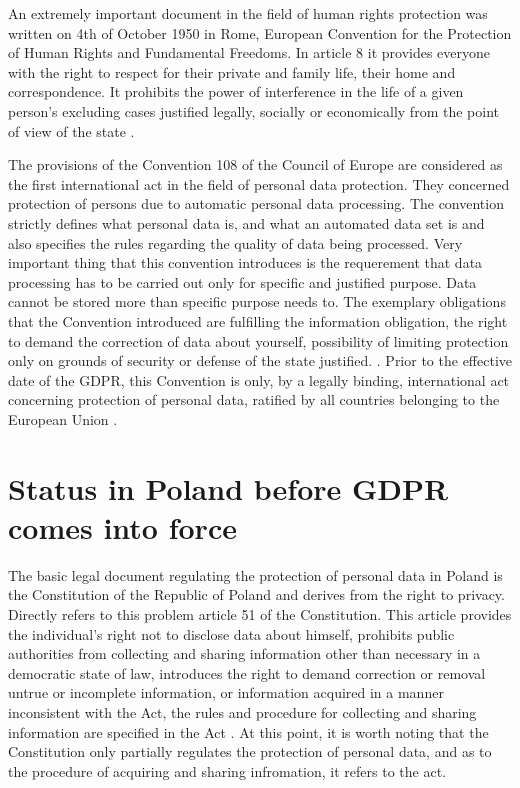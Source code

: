 \documentclass[en, noamssymb]{mgr}
\begin{document}
\indent An extremely important document in the field of human rights protection was written on 4th of October 1950 in Rome, European Convention for the Protection of Human Rights and Fundamental Freedoms. In article 8 it provides everyone with the right to respect for their private and family life, their home and correspondence. It prohibits the power of interference in the life of a given person's excluding cases justified legally, socially or economically from the point of view of the state \cite{prawo_odo}.

\indent The provisions of the Convention 108 of the Council of Europe are considered as the first international act in the field of personal data protection. They concerned protection of persons due to automatic personal data processing. The convention strictly defines what personal data is, and what an automated data set is and also specifies the rules regarding the quality of data being processed. Very important thing that this convention introduces is the requerement that data processing has to be carried out only for specific and justified purpose. Data cannot be stored more than specific purpose needs to. The exemplary obligations that the Convention introduced are fulfilling the information obligation, the right to demand the correction of data about yourself, possibility of limiting protection only on grounds of security or defense of the state justified. \cite{prawo_odo}. Prior to the effective date of the GDPR, this Convention is only, by a legally binding, international act concerning protection of personal data, ratified by all countries belonging to the European Union \cite{prawo_odo}.



\section{Status in Poland before GDPR comes into force}

The basic legal document regulating the protection of personal data in Poland is the Constitution of the Republic of Poland and derives from the right to privacy. Directly refers to this problem article 51 of the Constitution. This article provides the individual's right not to disclose data about himself, prohibits public authorities from collecting and sharing information other than necessary in a democratic state of law, introduces the right to demand correction or removal untrue or incomplete information, or information acquired in a manner inconsistent with the Act, the rules and procedure for collecting and sharing information are specified in the Act \cite{konstytucja_art51}. At this point, it is worth noting that the Constitution only partially regulates the protection of personal data, and as to the procedure of acquiring and sharing infromation, it refers to the act. 
\end{document}
